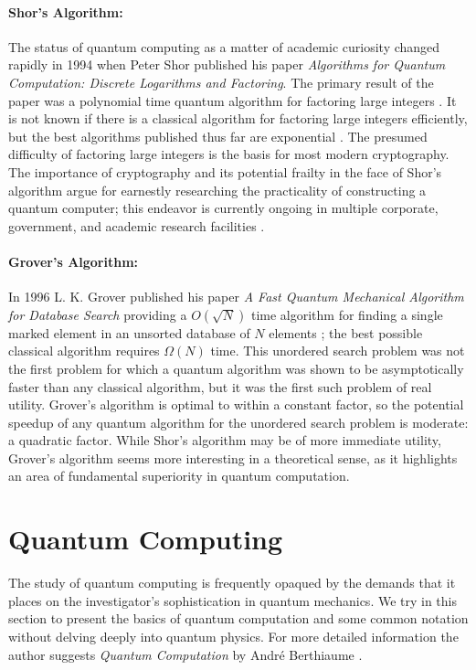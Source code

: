\paragraph{Shor's Algorithm:}
The status of quantum computing as a matter of academic curiosity
changed rapidly in 1994 when Peter Shor published his paper
\emph{Algorithms for Quantum Computation: Discrete Logarithms and
Factoring}.  The primary result of the paper was a polynomial time
quantum algorithm for factoring large integers
\cite{shor94algorithms}. It is not known if there is a classical
algorithm for factoring large integers efficiently, but the best
algorithms published thus far are exponential
\cite{williams98quantum}.  The presumed difficulty of factoring 
large integers is the basis for most modern cryptography.  The
importance of cryptography and its potential frailty in the face of
Shor's algorithm argue for earnestly researching the practicality of
constructing a quantum computer; this endeavor is currently ongoing in
multiple corporate, government, and academic research facilities
\cite{ibm01shor} \cite{chuang98quantum}.

\paragraph{Grover's Algorithm:}
In 1996 L. K. Grover published his paper \emph{A Fast Quantum
Mechanical Algorithm for Database Search} providing a $O(\sqrt{N})$
time algorithm for finding a single marked element in an unsorted
database of $N$ elements \cite{grover96fast}; the best possible
classical algorithm requires $\Omega(N)$ time.  This unordered search
problem was not the first problem for which a quantum algorithm was
shown to be asymptotically faster than any classical algorithm, but it
was the first such problem of real utility.  Grover's algorithm is
optimal to within a constant factor, so the potential speedup of any
quantum algorithm for the unordered search problem is moderate: a
quadratic factor.  While Shor's algorithm may be of more immediate
utility, Grover's algorithm seems more interesting in a theoretical
sense, as it highlights an area of fundamental superiority in quantum
computation.

\section{Quantum Computing}
\label{sec:quant}

The study of quantum computing is frequently opaqued by the demands
that it places on the investigator's sophistication in quantum
mechanics.  We try in this section to present the basics of quantum
computation and some common notation without delving deeply into
quantum physics.  For more detailed information the author suggests
\emph{Quantum Computation} by Andr\'{e} Berthiaume
\cite{berthiaume97quantum}.

